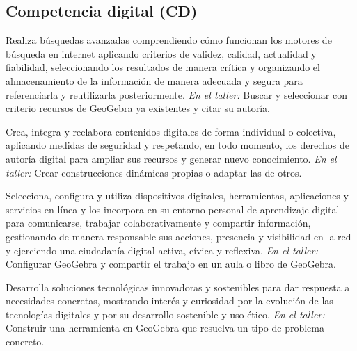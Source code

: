 \documentclass[11pt,a4paper]{article}
\begin{document}
\subsection*{Competencia digital (CD)}
\begin{description}[leftmargin=0pt, style=nextline]
  \item[\color{acento}CD1] Realiza búsquedas avanzadas comprendiendo cómo funcionan los motores de búsqueda en internet aplicando criterios de validez, calidad, actualidad y fiabilidad, seleccionando los resultados de manera crítica y organizando el almacenamiento de la información de manera adecuada y segura para referenciarla y reutilizarla posteriormente.\newline
    {\color{gris}\textit{En el taller:} Buscar y seleccionar con criterio recursos de GeoGebra ya existentes y citar su autoría.}
  \item[\color{acento}CD2] Crea, integra y reelabora contenidos digitales de forma individual o colectiva, aplicando medidas de seguridad y respetando, en todo momento, los derechos de autoría digital para ampliar sus recursos y generar nuevo conocimiento.\newline
    {\color{gris}\textit{En el taller:} Crear construcciones dinámicas propias o adaptar las de otros.}
  \item[\color{acento}CD3] Selecciona, configura y utiliza dispositivos digitales, herramientas, aplicaciones y servicios en línea y los incorpora en su entorno personal de aprendizaje digital para comunicarse, trabajar colaborativamente y compartir información, gestionando de manera responsable sus acciones, presencia y visibilidad en la red y ejerciendo una ciudadanía digital activa, cívica y reflexiva.\newline
    {\color{gris}\textit{En el taller:} Configurar GeoGebra y compartir el trabajo en un aula o libro de GeoGebra.}
  \item[\color{acento}CD5] Desarrolla soluciones tecnológicas innovadoras y sostenibles para dar respuesta a necesidades concretas, mostrando interés y curiosidad por la evolución de las tecnologías digitales y por su desarrollo sostenible y uso ético.\newline
    {\color{gris}\textit{En el taller:} Construir una herramienta en GeoGebra que resuelva un tipo de problema concreto.}
\end{description}
\end{document}
